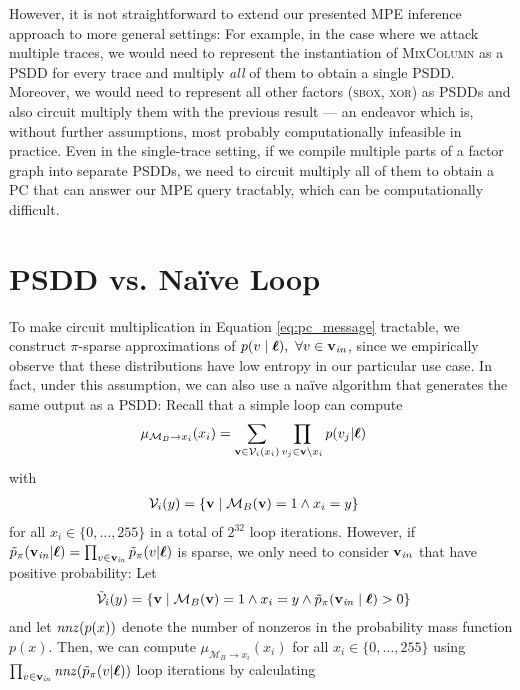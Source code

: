 However, it is not straightforward to extend our presented MPE inference approach to more general settings: For example, in the case where we attack multiple traces, we would need to represent the instantiation of \textsc{MixColumn} as a PSDD for every trace and multiply \emph{all} of them to obtain a single PSDD. Moreover, we would need to represent all other factors (\textsc{sbox}, \textsc{xor}) as PSDDs and also circuit multiply them with the previous result --- an endeavor which is, without further assumptions, most probably computationally infeasible in practice. 
Even in the single-trace setting, if we compile multiple parts of a factor graph into separate PSDDs, we need to circuit multiply all of them to obtain a PC that can answer our MPE query tractably, which can be computationally difficult.

\section{PSDD vs. Na\"ive Loop}
\label{sec:loop}
To make circuit multiplication in Equation \ref{eq:pc_message} tractable, we construct $\pi$-sparse approximations of $p(v \mid \boldsymbol{\ell}), \ \forall v \in \mathbf{v}_{\mathit{in}}$, since we empirically observe that these distributions have low entropy in our particular use case.
In fact, under this assumption, we can also use a na\"ive algorithm that generates the same output as a PSDD: Recall that a simple loop can compute
\begin{align}
    \mu_{\mathcal{M}_B \to x_i}(x_i) &= \sum_{\mathbf{v} \in \mathcal{V}_i(x_i)} \prod_{v_j \in \mathbf{v} \setminus x_i} p(v_j | \boldsymbol{\ell})
\end{align}
with 
\begin{align}
    \mathcal{V}_i(y) &= \{ \mathbf{v} \mid \mathcal{M}_B(\mathbf{v}) = 1 \land x_i = y \}
\end{align}
for all $x_i \in \{0,\dots,255\}$ in a total of $2^{32}$ loop iterations. However, if $\tilde{p}_\pi(\mathbf{v}_{\mathit{in}} | \boldsymbol{\ell}) = \prod_{v \in \mathbf{v}_{\mathit{in}}} \tilde{p}_\pi(v | \boldsymbol{\ell})$ is sparse, we only need to consider $\mathbf{v}_{\mathit{in}}$ that have positive probability: Let
\begin{align}
    \tilde{\mathcal{V}}_i(y) &= \{ \mathbf{v} \mid \mathcal{M}_B(\mathbf{v}) = 1 \land x_i = y \land \tilde{p}_\pi(\mathbf{v}_{\mathit{in}} \mid \boldsymbol{\ell}) > 0\}
\end{align}
and let $\operatorname{\mathit{nnz}}(p(x))$ denote the number of nonzeros in the probability mass function $p(x)$. 
Then, we can compute $\mu_{\mathcal{M}_B \to x_i}(x_i)$ for all $x_i \in \{0,\dots,255\}$ using $\prod_{v \in \mathbf{v}_{\mathit{in}}} \operatorname{\mathit{nnz}}(\tilde{p}_\pi(v | \boldsymbol{\ell}))$ loop iterations by calculating
